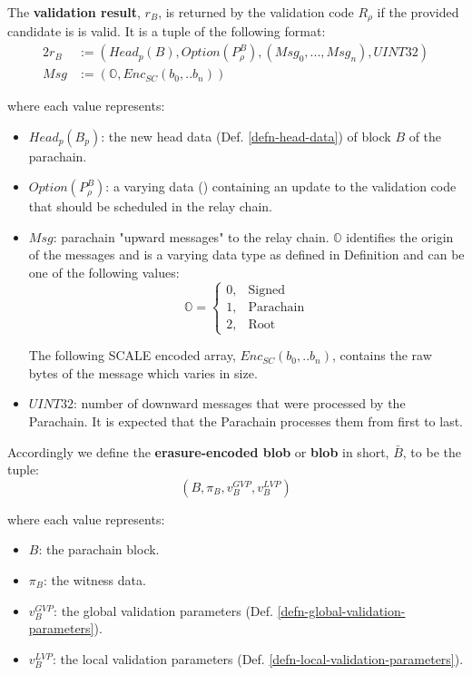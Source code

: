 \begin{definition}
  The \textbf{validation result}, $r_B$, is returned by the validation code $R_{\rho}$
  if the provided candidate is is valid. It is a tuple of the following format:
  \begin{alignat*}{2}
    r_B &:= (Head_p(B), Option(P^B_{\rho}), (Msg_0, ..., Msg_n), UINT32) \\
    Msg &:= (\mathbb{O}, Enc_{SC}(b_0,.. b_n))
  \end{alignat*}

  where each value represents:
  \begin{itemize}
    \item $Head_p(B_p)$: the new head data (Def. \ref{defn-head-data}) of
    block $B$ of the parachain.
    \item $Option(P^B_{\rho})$: a varying data () containing an update
    to the validation code that should be scheduled in the relay chain.
    \item $Msg$: parachain "upward messages" to the relay chain. $\mathbb{O}$ identifies
    the origin of the messages and is a varying data type as defined in
    Definition  and can be one of the following values:
    \begin{equation*}
      \mathbb{O} =
      \begin{cases}
        0, & \text{Signed} \\
        1, & \text{Parachain} \\
        2, & \text{Root}
      \end{cases}
    \end{equation*}

    The following SCALE encoded array, $Enc_{SC}(b_0,.. b_n)$, contains the
    raw bytes of the message which varies in size.
    \item $UINT32$: number of downward messages that were processed by the Parachain. It
    is expected that the Parachain processes them from first to last.
  \end{itemize}
\end{definition}

\begin{definition}
  \label{defn-blob}
  Accordingly we define the {\bf erasure-encoded blob} or {\bf blob} in short,
  {\bf $\bar{B}$}, to be the tuple:
  \[
  (B, \pi_B, v^{GVP}_B, v^{LVP}_B)
  \]

  where each value represents:

  \begin{itemize}
    \item $B$: the parachain block.
    \item $\pi_B$: the witness data.
    \item $v^{GVP}_B$: the global validation parameters (Def. \ref{defn-global-validation-parameters}).
    \item $v^{LVP}_B$: the local validation parameters (Def. \ref{defn-local-validation-parameters}).
  \end{itemize}
\end{definition}

